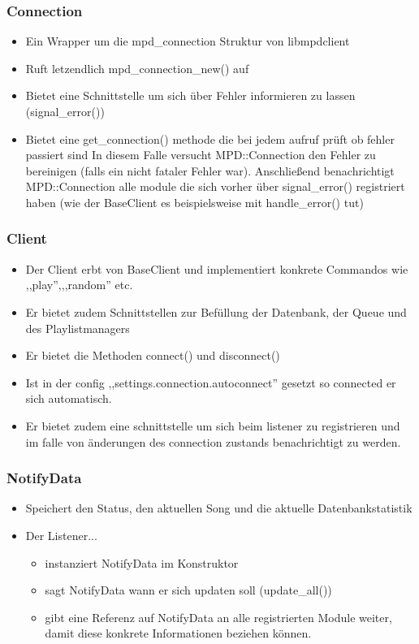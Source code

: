 \subsubsection{Connection}
\begin{itemize}
    \item Ein Wrapper um die mpd\_connection Struktur von libmpdclient
    \item Ruft letzendlich mpd\_connection\_new() auf 
    \item Bietet eine Schnittstelle um sich über Fehler informieren zu lassen (signal\_error())
    \item Bietet eine get\_connection() methode die bei jedem aufruf prüft ob fehler passiert sind
        In diesem Falle versucht MPD::Connection den Fehler zu bereinigen (falls ein nicht fataler Fehler war).
        Anschließend benachrichtigt MPD::Connection alle module die sich vorher über signal\_error() 
        registriert haben (wie der BaseClient es beispielsweise mit handle\_error() tut)
\end{itemize}

\subsubsection{Client}
\begin{itemize}
    \item Der Client erbt von BaseClient und implementiert konkrete Commandos wie ,,play'',,,random'' etc.
    \item Er bietet zudem Schnittstellen zur Befüllung der Datenbank, der Queue und des Playlistmanagers
    \item Er bietet die Methoden connect() und disconnect() 
    \item Ist in der config ,,settings.connection.autoconnect'' gesetzt so connected er sich automatisch.
    \item Er bietet zudem eine schnittstelle um sich beim listener zu registrieren und im falle von 
        änderungen des connection zustands benachrichtigt zu werden.
\end{itemize}

\subsubsection{NotifyData}
\begin{itemize}
    \item Speichert den Status, den aktuellen Song und die aktuelle Datenbankstatistik
    \item Der Listener...
        \begin{itemize}
            \item instanziert NotifyData im Konstruktor
            \item sagt NotifyData wann er sich updaten soll (update\_all())
            \item gibt eine Referenz auf NotifyData an alle registrierten Module weiter,
                damit diese konkrete Informationen beziehen können.
        \end{itemize}
\end{itemize}


